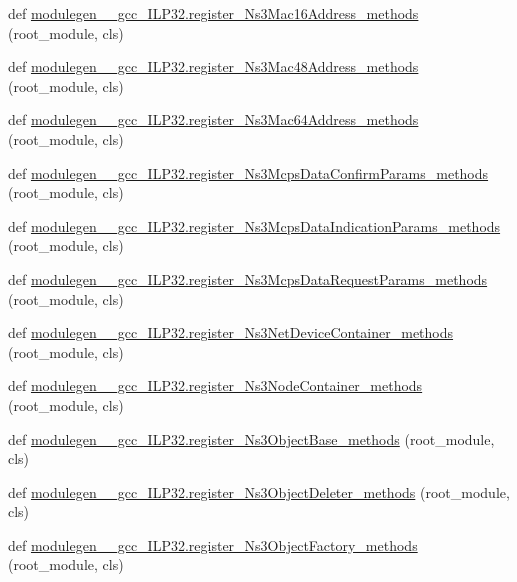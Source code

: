 \begin{DoxyCompactItemize}
\item 
def \hyperlink{namespacemodulegen____gcc__ILP32_a8f2187f2af782224783345b474bd2609}{modulegen\+\_\+\+\_\+gcc\+\_\+\+I\+L\+P32.\+register\+\_\+\+Ns3\+Mac16\+Address\+\_\+methods} (root\+\_\+module, cls)
\item 
def \hyperlink{namespacemodulegen____gcc__ILP32_a8e21fcb75de80cc6b1cd32abe7cfdd36}{modulegen\+\_\+\+\_\+gcc\+\_\+\+I\+L\+P32.\+register\+\_\+\+Ns3\+Mac48\+Address\+\_\+methods} (root\+\_\+module, cls)
\item 
def \hyperlink{namespacemodulegen____gcc__ILP32_a19876547640bfc76cded67b4683a28e6}{modulegen\+\_\+\+\_\+gcc\+\_\+\+I\+L\+P32.\+register\+\_\+\+Ns3\+Mac64\+Address\+\_\+methods} (root\+\_\+module, cls)
\item 
def \hyperlink{namespacemodulegen____gcc__ILP32_af6b059bee3c90d57ce4fcc944a0f4469}{modulegen\+\_\+\+\_\+gcc\+\_\+\+I\+L\+P32.\+register\+\_\+\+Ns3\+Mcps\+Data\+Confirm\+Params\+\_\+methods} (root\+\_\+module, cls)
\item 
def \hyperlink{namespacemodulegen____gcc__ILP32_a2dabb4180a955bffd98a9a4e80f8c069}{modulegen\+\_\+\+\_\+gcc\+\_\+\+I\+L\+P32.\+register\+\_\+\+Ns3\+Mcps\+Data\+Indication\+Params\+\_\+methods} (root\+\_\+module, cls)
\item 
def \hyperlink{namespacemodulegen____gcc__ILP32_a01e21eab5749600c41f3e1bde0507aef}{modulegen\+\_\+\+\_\+gcc\+\_\+\+I\+L\+P32.\+register\+\_\+\+Ns3\+Mcps\+Data\+Request\+Params\+\_\+methods} (root\+\_\+module, cls)
\item 
def \hyperlink{namespacemodulegen____gcc__ILP32_aa9b79a6cfb60163ed439b9298fb5c7d7}{modulegen\+\_\+\+\_\+gcc\+\_\+\+I\+L\+P32.\+register\+\_\+\+Ns3\+Net\+Device\+Container\+\_\+methods} (root\+\_\+module, cls)
\item 
def \hyperlink{namespacemodulegen____gcc__ILP32_a29b309b6bee1fe59273ea5b33c29fde1}{modulegen\+\_\+\+\_\+gcc\+\_\+\+I\+L\+P32.\+register\+\_\+\+Ns3\+Node\+Container\+\_\+methods} (root\+\_\+module, cls)
\item 
def \hyperlink{namespacemodulegen____gcc__ILP32_ae2b1090e9e01cb32c1979aebbbf2d3d0}{modulegen\+\_\+\+\_\+gcc\+\_\+\+I\+L\+P32.\+register\+\_\+\+Ns3\+Object\+Base\+\_\+methods} (root\+\_\+module, cls)
\item 
def \hyperlink{namespacemodulegen____gcc__ILP32_ae7b70d95135f82e9f3f5abb42654e3de}{modulegen\+\_\+\+\_\+gcc\+\_\+\+I\+L\+P32.\+register\+\_\+\+Ns3\+Object\+Deleter\+\_\+methods} (root\+\_\+module, cls)
\item 
def \hyperlink{namespacemodulegen____gcc__ILP32_a3c95ec67fc1514c6b5c58314ef81e38e}{modulegen\+\_\+\+\_\+gcc\+\_\+\+I\+L\+P32.\+register\+\_\+\+Ns3\+Object\+Factory\+\_\+methods} (root\+\_\+module, cls)

\end{DoxyCompactItemize}
